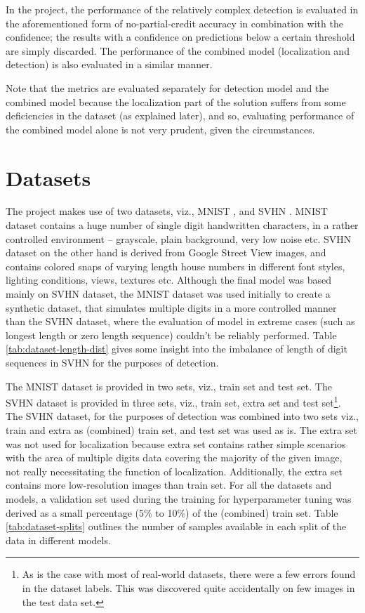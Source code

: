 \documentclass{article}
\begin{document}
	In the project, the performance of the relatively complex detection is evaluated in the aforementioned form of no-partial-credit accuracy in combination with the confidence; the results with a confidence on predictions below a certain threshold are simply discarded. The performance of the combined model (localization and detection) is also evaluated in a similar manner.
	
	Note that the metrics are evaluated separately for detection model and the combined model because the localization part of the solution suffers from some deficiencies in the dataset (as explained later), and so, evaluating performance of the combined model alone is not very prudent, given the circumstances.
	
	\section{Datasets}\label{datasets}
	The project makes use of two datasets, viz., MNIST \cite{mnist-dataset}\cite{lecun1998}, and SVHN \cite{svhn-dataset}\cite{netzer2011}. MNIST dataset contains a huge number of single digit handwritten characters, in a rather controlled environment -- grayscale, plain background, very low noise etc. SVHN dataset on the other hand is derived from Google Street View images, and contains colored snaps of varying length house numbers in different font styles, lighting conditions, views, textures etc. Although the final model was based mainly on SVHN dataset, the MNIST dataset was used initially to create a synthetic dataset, that simulates multiple digits in a more controlled manner than the SVHN dataset, where the evaluation of model in extreme cases (such as longest length or zero length sequence) couldn't be reliably performed. Table \ref{tab:dataset-length-dist} gives some insight into the imbalance of length of digit sequences in SVHN for the purposes of detection.
	
	The MNIST dataset is provided in two sets, viz., train set and test set. The SVHN dataset is provided in three sets, viz., train set, extra set and test set\footnote{As is the case with most of real-world datasets, there were a few errors found in the dataset labels. This was discovered quite accidentally on few images in the test data set.}. The SVHN dataset, for the purposes of detection was combined into two sets viz., train and extra as (combined) train set, and test set was used as is. The extra set was not used for localization because extra set contains rather simple scenarios with the area of multiple digits data covering the majority of the given image, not really necessitating the function of localization. Additionally, the extra set contains more low-resolution images than train set. For all the datasets and models, a validation set used during the training for hyperparameter tuning was derived as a small percentage (5\% to 10\%) of the (combined) train set. Table \ref{tab:dataset-splits} outlines the number of samples available in each split of the data in different models.
	
\end{document}
